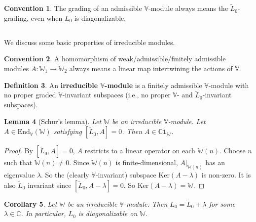 \documentclass[12pt,a4paper,notitlepage]{article}
\theoremstyle{definition}
\newtheorem{df}{Definition}[section]
\newtheorem{cv}[df]{Convention}
\theoremstyle{plain}
\newtheorem{co}[df]{Corollary}
\newtheorem{lm}[df]{Lemma}
\newcommand{\wtd}{\widetilde}
\newcommand{\End}{\mathrm{End}} %
\newcommand{\id}{\mathbf{1}}
\newcommand{\Vbb}{\mathbb V}
\newcommand{\Wbb}{\mathbb W}
\newcommand{\Cbb}{\mathbb C}
\newcommand{\Ker}{\mathrm{Ker}}
\numberwithin{equation}{section}
\begin{document}
\begin{cv}
	The grading of an admissible $\Vbb$-module always means the $\wtd L_0$-grading, even when $L_0$ is diagonalizable.
\end{cv}











\subsection{}

We discuss some basic properties of irreducible modules. 

\begin{cv}
A homomorphism of weak/admissible/finitely admissible modules $A:\Wbb_1\rightarrow\Wbb_2$ always means a linear map intertwining the actions of $\Vbb$.
\end{cv}


\begin{df}
	An \textbf{irreducible $\Vbb$-module}  is a finitely admissible $\Vbb$-module with no proper graded $\Vbb$-invariant subspaces (i.e., no proper $\Vbb$- and $\wtd L_0$-invariant subspaces). 
\end{df}

\begin{lm}[Schur's lemma]\label{lb82}
Let $\Wbb$ be an irreducible $\Vbb$-module. Let $A\in\End_\Vbb(\Wbb)$ satisfying $[\wtd L_0,A]=0$. Then $A\in\Cbb\id_\Wbb$.
\end{lm}

\begin{proof}
By $[\wtd L_0,A]=0$, $A$ restricts to a linear operator on each $\Wbb(n)$. Choose $n$ such that $\Wbb(n)\neq0$. Since $\Wbb(n)$ is finite-dimensional, $A|_{\Wbb(n)}$ has an eigenvalue $\lambda$. So the (clearly $\Vbb$-invariant) subspace $\Ker(A-\lambda)$ is non-zero. It is also $\wtd L_0$ invariant since $[\wtd L_0,A-\lambda]=0$. So $\Ker(A-\lambda)=\Wbb$.
\end{proof}






\begin{co}\label{lb92}
Let $\Wbb$ be an irreducible $\Vbb$-module. Then $L_0=\wtd L_0+\lambda$ for some $\lambda\in\Cbb$. In particular, $L_0$ is diagonalizable on $\Wbb$.
\end{co}
\end{document}
